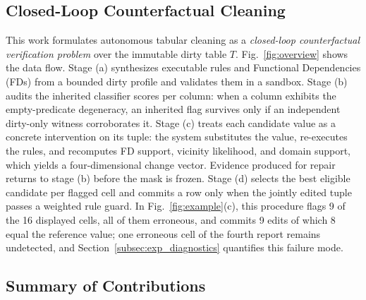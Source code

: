 \documentclass[conference]{IEEEtran}
\begin{document}
\subsection{Closed-Loop Counterfactual Cleaning}
\label{subsec:intro_novelty}

This work formulates autonomous tabular cleaning as a \emph{closed-loop counterfactual verification problem} over the immutable dirty table $T$. Fig.~\ref{fig:overview} shows the data flow. Stage (a) synthesizes executable rules and Functional Dependencies (FDs) from a bounded dirty profile and validates them in a sandbox. Stage (b) audits the inherited classifier scores per column: when a column exhibits the empty-predicate degeneracy, an inherited flag survives only if an independent dirty-only witness corroborates it. Stage (c) treats each candidate value as a concrete intervention on its tuple: the system substitutes the value, re-executes the rules, and recomputes FD support, vicinity likelihood, and domain support, which yields a four-dimensional change vector. Evidence produced for repair returns to stage (b) before the mask is frozen. Stage (d) selects the best eligible candidate per flagged cell and commits a row only when the jointly edited tuple passes a weighted rule guard. In Fig.~\ref{fig:example}(c), this procedure flags 9 of the 16 displayed cells, all of them erroneous, and commits 9 edits of which 8 equal the reference value; one erroneous cell of the fourth report remains undetected, and Section~\ref{subsec:exp_diagnostics} quantifies this failure mode.

\subsection{Summary of Contributions}
\label{subsec:intro_contributions}
\end{document}
